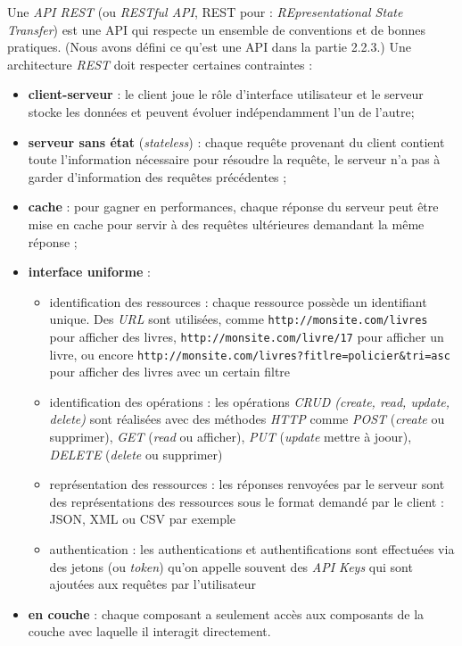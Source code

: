 Une \textit{API REST} (ou \textit{RESTful API}, REST pour : \textit{REpresentational State Transfer}) est une API qui respecte un ensemble de conventions et de bonnes pratiques. (Nous avons défini ce qu'est une API dans la partie 2.2.3.) Une architecture \textit{REST} doit respecter certaines contraintes :
\begin{itemize}[font=\color{blue}, label=]
  \item \textbf{client-serveur} : le client joue le rôle d'interface utilisateur et le serveur stocke les données et peuvent évoluer indépendamment l'un de l'autre;
  \item \textbf{serveur sans état} (\textit{stateless}) : chaque requête provenant du client contient toute l'information nécessaire pour résoudre la requête, le serveur n'a pas à garder d'information des requêtes précédentes ;
  \item \textbf{cache} : pour gagner en performances, chaque réponse du serveur peut être mise en cache pour servir à des requêtes ultérieures demandant la même réponse ;
  \item \textbf{interface uniforme} :
    \begin{itemize}[font=\color{blue}, label=]
      \item identification des ressources : chaque ressource possède un identifiant unique. Des \textit{URL} sont utilisées, comme \texttt{http://monsite.com/livres} pour afficher des livres, \texttt{http://monsite.com/livre/17} pour afficher un livre, ou encore \texttt{http://monsite.com/livres?fitlre=policier\&tri=asc} pour afficher des livres avec un certain filtre
      \item identification des opérations : les opérations \textit{CRUD (create, read, update, delete)} sont réalisées avec des méthodes \textit{HTTP} comme \textit{POST} (\textit{create} ou supprimer), \textit{GET} (\textit{read} ou afficher), \textit{PUT} (\textit{update} mettre à joour), \textit{DELETE} (\textit{delete} ou supprimer)
      \item représentation des ressources : les réponses renvoyées par le serveur sont des représentations des ressources sous le format demandé par le client : JSON, XML ou CSV par exemple
      \item authentication : les authentications et authentifications sont effectuées via des jetons (ou \textit{token}) qu'on appelle souvent des \textit{API Keys} qui sont ajoutées aux requêtes par l'utilisateur
    \end{itemize}
  \item \textbf{en couche} : chaque composant a seulement accès aux composants de la couche avec laquelle il interagit directement.
\end{itemize}

